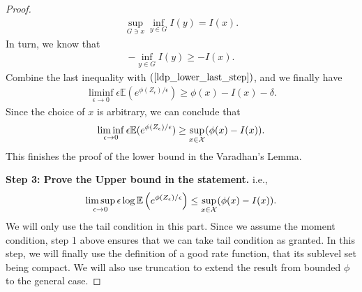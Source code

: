 \documentclass[10pt]{article}
\def\X{{\cal X}}
\newcommand{\e}{\mathbb{E}}
\newenvironment{Proof of lemma}{\noindent{\bf Proof of Lemma}}{\hfill$\Box$\newline}
\newenvironment{Proof of claim}{\noindent{\bf Proof of claim}}{\hfill$\Box$\newline}
\newenvironment{Proof of theorem}{\noindent{\bf Proof of Theorem}}{\hfill\scriptsize{$\Box$}\newline}
\newenvironment{Proof of theorems}{\noindent{\bf Proof of Theorems}}{\hfill$\Box$\newline}
\newenvironment{Proof of proposition}{\noindent{\bf Proof of Proposition}}{\hfill$\Box$\newline}
\newenvironment{Proof of propositions}{\noindent{\bf Proof of Propositions}}{\hfill$\Box$\newline}
\newenvironment{Proof of exercise}{\noindent{\it Proof of Exercise:}}{\hfill$\Box$}
\numberwithin{equation}{section}
\begin{document}
\begin{proof}
\begin{align}
        \sup_{G \ni x}\inf_{y \in G} I(y) = I(x).
    \end{align} 
    In turn, we know that
    \begin{align}
        - \inf_{y \in G} I(y) \geq -I(x).
    \end{align}
    Combine the last inequality with $(\ref{ldp_lower_last_step})$, and we finally have
    \begin{align}
        \liminf_{\epsilon \to 0} \epsilon \e(e^{\phi(Z_{\epsilon})/\epsilon}) \geq \phi(x) - I(x) -\delta.
    \end{align}
    Since the choice of $x$ is arbitrary, we can conclude that
    \begin{align}
        \liminf_{\epsilon \to 0} \epsilon \e(e^{\phi(Z_{\epsilon})/\epsilon}) \geq \sup_{x \in \X}(\phi(x) - I(x)).
    \end{align}
    This finishes the proof of the lower bound in the Varadhan's Lemma.

    \textbf{Step 3: Prove the Upper bound in the statement.} i.e.,
    \begin{align}
            \limsup_{\epsilon \to 0} \epsilon \log \e \left(e^{\phi(Z_{\epsilon})/\epsilon}\right) \leq \sup_{x \in \X}(\phi(x)-I(x)).
    \end{align}
    We will only use the tail condition in this part. Since we assume the moment condition, step 1 above ensures that we can take tail condition as granted. In this step, we will finally use the definition of a good rate function, that its sublevel set being compact. We will also use truncation to extend the result from bounded $\phi$ to the general case.


\end{proof}
\end{document}
